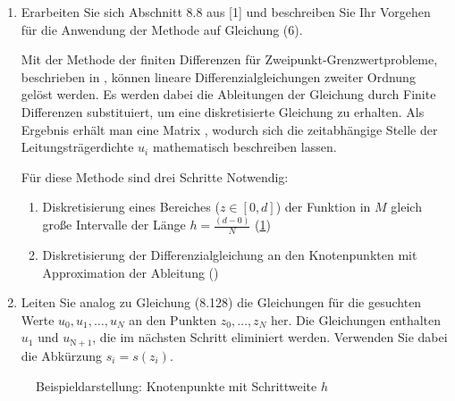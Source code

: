 \begin{enumerate}
	\item Erarbeiten Sie sich Abschnitt 8.8 aus [1] und beschreiben Sie Ihr Vorgehen für die Anwendung der Methode auf Gleichung (6).

	Mit der Methode der finiten Differenzen für Zweipunkt-Grenzwertprobleme, beschrieben in \cite[p. 442]{Atkinson.2004}, können lineare Differenzialgleichungen zweiter Ordnung gelöst werden. Es werden dabei die Ableitungen der Gleichung durch Finite Differenzen substituiert, um eine diskretisierte Gleichung zu erhalten.
	Als Ergebnis erhält man eine Matrix , wodurch sich die zeitabhängige Stelle der Leitungsträgerdichte $u_i$ mathematisch beschreiben lassen. 
	
	Für diese Methode sind drei Schritte Notwendig:
	\begin{enumerate}
		\item Diskretisierung eines Bereiches ($z\in [0,d]$) der Funktion in $M$ gleich große Intervalle der Länge $h=\frac{(d-0)}{N}$ (\cref{fig:bsp_knotenpunkte})
		\item Diskretisierung der Differenzialgleichung an den Knotenpunkten mit Approximation der Ableitung ()
	\end{enumerate}

	\item Leiten Sie analog zu Gleichung (8.128) die Gleichungen für die gesuchten Werte  $u_0, u_1, \dots , u_N$ an den Punkten $z_0,\dots , z_N$ her. Die Gleichungen enthalten $u_1$ und $u_\mathrm{N+1}$, die im nächsten Schritt eliminiert werden. Verwenden Sie dabei die Abkürzung $ s_i = s(z_i)$.
\end{enumerate}
 
 \begin{figure}[htb]
 	\centering
\caption{Beispieldarstellung: Knotenpunkte mit Schrittweite $h$}
\label{fig:bsp_knotenpunkte}
 \end{figure}



